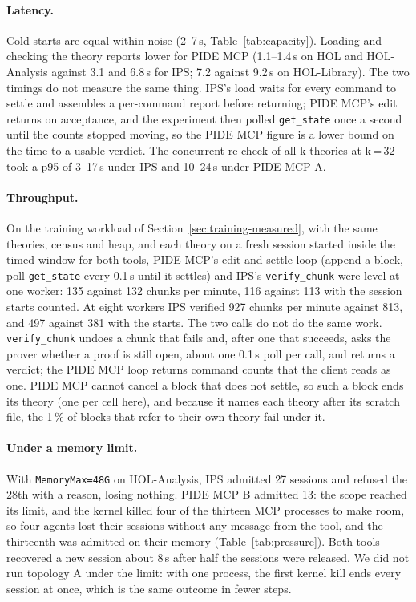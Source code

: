 \documentclass[11pt]{article}
\newcommand{\code}[1]{\colorbox{gray!12}{\texttt{\vphantom{Ag}#1}}}
\begin{document}
\paragraph{Latency.} Cold starts are equal within noise (2--7\,s,
Table~\ref{tab:capacity}). Loading and checking the theory reports lower
for PIDE MCP (1.1--1.4\,s on HOL and HOL-Analysis against 3.1 and 6.8\,s
for IPS; 7.2 against 9.2\,s on HOL-Library). The two timings do not
measure the same thing. IPS's load waits for every command to settle and
assembles a per-command report before returning; PIDE MCP's edit returns
on acceptance, and the experiment then polled \code{get\_state} once a
second until the counts stopped moving, so the PIDE MCP figure is a lower
bound on the time to a usable verdict. The concurrent re-check of all k
theories at k\,=\,32 took a p95 of 3--17\,s under IPS and 10--24\,s
under PIDE MCP A.

\paragraph{Throughput.} On the training workload of
Section~\ref{sec:training-measured}, with the same theories, census and
heap, and each theory on a fresh session started inside the timed window
for both tools, PIDE MCP's edit-and-settle loop (append a block, poll
\code{get\_state} every 0.1\,s until it settles) and IPS's
\code{verify\_chunk} were level at one worker: 135 against 132 chunks per
minute, 116 against 113 with the session starts counted. At eight workers
IPS verified 927 chunks per minute against 813, and 497 against 381 with
the starts. The two calls do not do the same work. \code{verify\_chunk}
undoes a chunk that fails and, after one that succeeds, asks the prover
whether a proof is still open, about one 0.1\,s poll per call, and
returns a verdict; the PIDE MCP loop returns command counts that the
client reads as one. PIDE MCP cannot cancel a block that does not settle,
so such a block ends its theory (one per cell here), and because it names
each theory after its scratch file, the 1\,\% of blocks that refer to
their own theory fail under it.

\paragraph{Under a memory limit.} With \code{MemoryMax=48G} on
HOL-Analysis, IPS admitted 27 sessions and refused the 28th with a reason,
losing nothing. PIDE MCP B admitted 13: the scope reached its limit, and
the kernel killed four of the thirteen MCP processes to make room, so
four agents lost their sessions without any message from the tool, and
the thirteenth was admitted on their memory (Table~\ref{tab:pressure}).
Both tools recovered a new session about 8\,s after half the sessions
were released. We did not run topology A under the limit: with one
process, the first kernel kill ends every session at once, which is the
same outcome in fewer steps.
\end{document}
